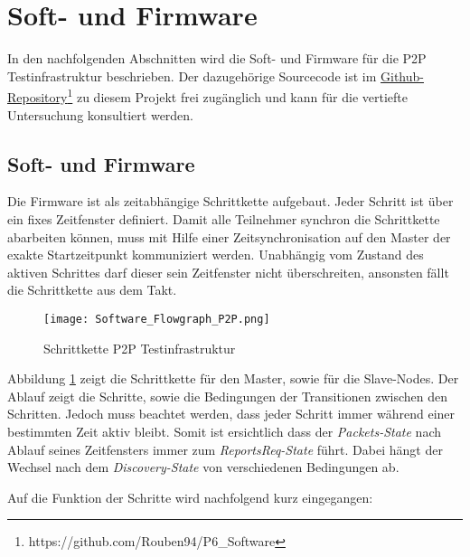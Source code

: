 \newpage
\section{Soft- und Firmware}\label{sec:P2PSoft-undFirmware}
In den nachfolgenden Abschnitten wird die Soft- und Firmware für die P2P Testinfrastruktur beschrieben.
Der dazugehörige Sourcecode ist im \href{https://github.com/Rouben94/P6_Software}{Github-Repository\footnote{\url{https://github.com/Rouben94/P6_Software}\cite{github_p6_software_p2p_2020}}} zu diesem Projekt frei zugänglich und kann für die vertiefte Untersuchung konsultiert werden.

\subsection{Soft- und Firmware}\label{sec:SoftundFirmware}
Die Firmware ist als zeitabhängige Schrittkette aufgebaut.
Jeder Schritt ist über ein fixes Zeitfenster definiert.
Damit alle Teilnehmer synchron die Schrittkette abarbeiten können, muss mit Hilfe einer Zeitsynchronisation auf den Master der exakte Startzeitpunkt kommuniziert werden.
Unabhängig vom Zustand des aktiven Schrittes darf dieser sein Zeitfenster nicht überschreiten, ansonsten fällt die Schrittkette aus dem Takt. 

\begin{figure} [H]
	\centering
	\texttt{[image: Software\_Flowgraph\_P2P.png]}
	\caption{Schrittkette P2P Testinfrastruktur}
	\label{fig:FlowgraphP2P}
\end{figure}

Abbildung \ref{fig:FlowgraphP2P} zeigt die Schrittkette für den Master, sowie für die Slave-Nodes.
Der Ablauf zeigt die Schritte, sowie die Bedingungen der Transitionen zwischen den Schritten.
Jedoch muss beachtet werden, dass jeder Schritt immer während einer bestimmten Zeit aktiv bleibt.
Somit ist ersichtlich dass der \textit{Packets-State} nach Ablauf seines Zeitfensters immer zum \textit{ReportsReq-State} führt.
Dabei hängt der Wechsel nach dem \textit{Discovery-State} von verschiedenen Bedingungen ab.

Auf die Funktion der Schritte wird nachfolgend kurz eingegangen: 

